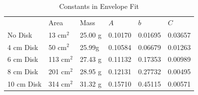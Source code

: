 \documentclass[12pt,letterpaper]{article}
\begin{document}
\begin{table}[ht]
\centering
\begin{tabular}{llllll}
                                & Area                            & Mass                         & $A$                          & $b$                          & $C$                          \\ \cline{2-6} 
\multicolumn{1}{l|}{No Disk}    & \multicolumn{1}{l|}{13 cm$^2$}  & \multicolumn{1}{l|}{25.00 g} & \multicolumn{1}{l|}{0.10170} & \multicolumn{1}{l|}{0.01695} & \multicolumn{1}{l|}{0.03657} \\ \cline{2-6} 
\multicolumn{1}{l|}{4 cm Disk}  & \multicolumn{1}{l|}{50 cm$^2$}  & \multicolumn{1}{l|}{25.99g}  & \multicolumn{1}{l|}{0.10584} & \multicolumn{1}{l|}{0.06679} & \multicolumn{1}{l|}{0.01263} \\ \cline{2-6} 
\multicolumn{1}{l|}{6 cm Disk}  & \multicolumn{1}{l|}{113 cm$^2$} & \multicolumn{1}{l|}{27.43 g} & \multicolumn{1}{l|}{0.11132} & \multicolumn{1}{l|}{0.17353} & \multicolumn{1}{l|}{0.00989} \\ \cline{2-6} 
\multicolumn{1}{l|}{8 cm Disk}  & \multicolumn{1}{l|}{201 cm$^2$} & \multicolumn{1}{l|}{28.95 g} & \multicolumn{1}{l|}{0.12131} & \multicolumn{1}{l|}{0.27732} & \multicolumn{1}{l|}{0.00495} \\ \cline{2-6} 
\multicolumn{1}{l|}{10 cm Disk} & \multicolumn{1}{l|}{314 cm$^2$} & \multicolumn{1}{l|}{31.32 g} & \multicolumn{1}{l|}{0.15710} & \multicolumn{1}{l|}{0.45115} & \multicolumn{1}{l|}{0.00571} \\ \cline{2-6} 
\end{tabular}
\caption{Constants in Envelope Fit}
\label{tab:envelope}
\end{table}
\end{document}
